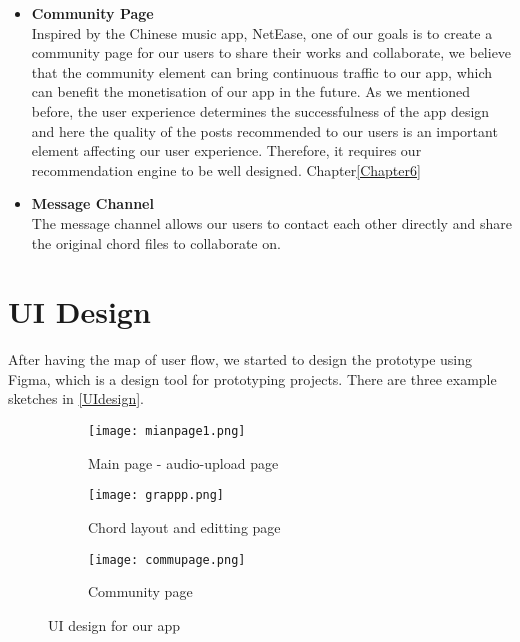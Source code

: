 \begin{itemize}
\item \textbf{Community Page}
\\Inspired by the Chinese music app, NetEase, one of our goals is to create a community page for our users to share their works and collaborate, 
we believe that the community element can bring continuous traffic to our app, which can benefit the monetisation of our app in the future.
As we mentioned before, the user experience determines the successfulness of the app design and here the quality of the posts recommended to our users is an important element affecting our user experience. 
Therefore, it requires our recommendation engine to be well designed. Chapter\ref{Chapter6}

\item \textbf{Message Channel}
\\The message channel allows our users to contact each other directly and share the original chord files to collaborate on.

\end{itemize}

\section{UI Design}
After having the map of user flow, we started to design the prototype using Figma, which is a design tool for prototyping projects. 
There are three example sketches in \autoref{UIdesign}. 

\begin{figure}[ht]
    \label{UIdesign}
     \centering
     \hspace{16mm}
     \begin{subfigure}[b]{0.2\textwidth}
         \centering
         \texttt{[image: mianpage1.png]}
         \caption{Main page - audio-upload page}
         \label{Mainpage}
     \end{subfigure}
     \hfill
     \begin{subfigure}[b]{0.2\textwidth}
         \centering
         \texttt{[image: grappp.png]}
         \caption{Chord layout and editting page}
         \label{chordedit}
     \end{subfigure}
     \hfill
     \begin{subfigure}[b]{0.2\textwidth}
         \centering
         \texttt{[image: commupage.png]}
         \caption{Community page}
         \label{Community page}
     \end{subfigure}
     \hspace{16mm}
        \caption{UI design for our app}
        \label{fig:three graphs}
\end{figure}


